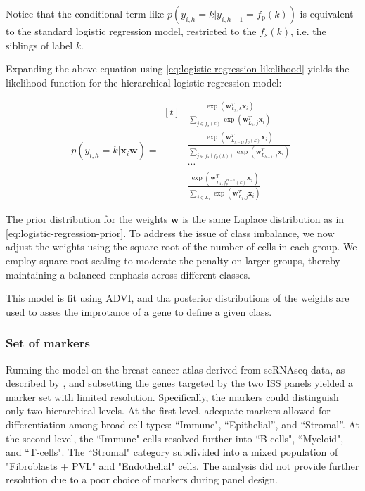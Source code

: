 Notice that the conditional term like $p(y_{i,h} = k | y_{i,h-1} = f_{\text{p}}(k))$ is equivalent to the standard logistic regression model, restricted to the $f_s(k)$, i.e. the siblings of label $k$. 

Expanding the above equation using \cref{eq:logistic-regression-likelihood} yields the likelihood function for the hierarchical logistic regression model:

\begin{equation}
    p(y_{i,h} = k | \mathbf{x}_{i} \mathbf{w}) = \begin{aligned}[t]
        & \frac{\exp(\mathbf{w}_{L_h, k}^T \mathbf{x}_i)}{\sum_{j \in f_s(k)} \exp(\mathbf{w}_{L_h, j}^T \mathbf{x}_i)} \\
        & \frac{\exp(\mathbf{w}_{L_{h-1}, f_p(k)}^T \mathbf{x}_i)}{\sum_{j \in  f_s(f_p(k))} \exp(\mathbf{w}_{L_{h-1}, j}^T \mathbf{x}_i)} \\
        & \cdots \\
        & \frac{\exp(\mathbf{w}_{L_1, f_p^{H-1}(k)}^T \mathbf{x}_i)}{\sum_{j \in L_1} \exp(\mathbf{w}_{L_1, j}^T \mathbf{x}_i)}
    \end{aligned}
\end{equation}

The prior distribution for the weights $\mathbf{w}$ is the same Laplace distribution as in \cref{eq:logistic-regression-prior}. To address the issue of class imbalance, we now adjust the weights using the square root of the number of cells in each group. We employ square root scaling to moderate the penalty on larger groups, thereby maintaining a balanced emphasis across different classes.

This model is fit using \ac{ADVI}, and tha posterior distributions of the weights are used to asses the improtance of a gene to define a given class. 

\subsubsection*{Set of markers}

Running the model on the breast cancer atlas derived from \ac{scRNAseq} data, as described by \textcite{Wu2021-uq}, and subsetting the genes targeted by the two \ac{ISS} panels yielded a marker set with limited resolution. Specifically, the markers could distinguish only two hierarchical levels. At the first level, adequate markers allowed for differentiation among broad cell types: ``Immune", ``Epithelial'', and ``Stromal''. At the second level, the ``Immune" cells resolved further into ``B-cells", ``Myeloid", and ``T-cells". The ``Stromal" category subdivided into a mixed population of "Fibroblasts + PVL" and "Endothelial" cells. The analysis did not provide further resolution due to a poor choice of markers during panel design.

